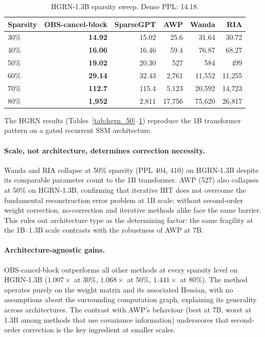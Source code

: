 \documentclass{article}
\begin{document}
\begin{table}[htbp]
  \centering
  \caption{HGRN-1.3B sparsity sweep. Dense PPL: 14.18.}
  \label{tab:hgrn_sweep}
  \small
  \begin{tabular}{lrrrrr}
    \toprule
    Sparsity & OBS-cancel-block & SparseGPT & AWP & Wanda & RIA \\
    \midrule
    30\% & \textbf{14.92}  & 15.02  & 25.6      & 31.64     & 30.72     \\
    40\% & \textbf{16.06}  & 16.46  & 59.4      & 76.87     & 68.27     \\
    50\% & \textbf{19.02}  & 20.30  & 527       & 584       & 499       \\
    60\% & \textbf{29.14}  & 32.43  & 2{,}761   & 11{,}552  & 11{,}255  \\
    70\% & \textbf{112.7}  & 115.4  & 5{,}123   & 20{,}592  & 14{,}723  \\
    80\% & \textbf{1{,}952}& 2{,}811& 17{,}756  & 75{,}620  & 26{,}817  \\
    \bottomrule
  \end{tabular}
\end{table}

The HGRN results (Tables~\ref{tab:hgrn_50}--\ref{tab:hgrn_sweep}) reproduce
the 1B transformer pattern on a gated recurrent SSM architecture.

\paragraph{Scale, not architecture, determines correction necessity.}
Wanda and RIA collapse at 50\% sparsity (PPL 404, 410) on HGRN-1.3B despite
its comparable parameter count to the 1B transformer. AWP (527) also collapses
at 50\% on HGRN-1.3B, confirming that iterative IHT does not overcome the
fundamental reconstruction error problem at 1B scale: without second-order
weight correction, no-correction and iterative methods alike face the same
barrier. This rules out architecture type as the determining factor: the same
fragility at the 1B--1.3B scale contrasts with the robustness of AWP at 7B.

\paragraph{Architecture-agnostic gains.}
OBS-cancel-block outperforms all other methods at every sparsity level on
HGRN-1.3B ($1.007\times$ at 30\%, $1.068\times$ at 50\%, $1.441\times$ at
80\%). The method operates purely on the weight matrix and its associated
Hessian, with no assumptions about the surrounding computation graph,
explaining its generality across architectures. The contrast with AWP's
behaviour (best at 7B, worst at 1.3B among methods that use covariance
information) underscores that second-order correction is the key ingredient at
smaller scales.
\end{document}
